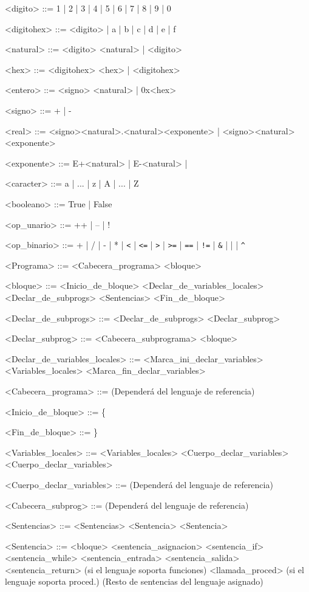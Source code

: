 \documentclass{scrartcl}
\begin{document}
\setlength{\grammarparsep}{4pt plus 1pt minus 1pt}
\begin{grammar}

<digito> ::= 1 | 2 | 3 | 4 | 5 | 6 | 7 | 8 | 9 | 0

<digitohex> ::= <digito> | a | b | c | d | e | f

<natural> ::= <digito> <natural> | <digito>

<hex> ::= <digitohex> <hex> | <digitohex>

<entero> ::= <signo> <natural> | 0x<hex>

<signo> ::= + | -

<real> ::= <signo><natural>.<natural><exponente> | <signo><natural><exponente>

<exponente> ::= E+<natural> | E-<natural> |

<caracter> ::= a | ... | z | A | ... | Z

<booleano> ::= True | False

<op_unario> ::= ++ | -- | !

<op_binario> ::= + | / | - | * | \verb|<| | \verb|<=| | \verb|>| | \verb|>=| | \verb|==| | \verb|!=| | \verb|&| | \verb||| | \verb|^|

<Programa> ::= <Cabecera_programa> <bloque>

<bloque> ::= <Inicio_de_bloque>
 <Declar_de_variables_locales>
 <Declar_de_subprogs>
 <Sentencias>
 <Fin_de_bloque>

<Declar_de_subprogs> ::= <Declar_de_subprogs> <Declar_subprog>

<Declar_subprog> ::= <Cabecera_subprograma> <bloque>

<Declar_de_variables_locales> ::= <Marca_ini_declar_variables>
<Variables_locales>
<Marca_fin_declar_variables>

<Cabecera_programa> ::= (Dependerá del lenguaje de referencia)

<Inicio_de_bloque> ::= \{

<Fin_de_bloque> ::= \}

<Variables_locales> ::= <Variables_locales> <Cuerpo_declar_variables>
\alt <Cuerpo_declar_variables>

<Cuerpo_declar_variables> ::= (Dependerá del lenguaje de referencia)

<Cabecera_subprog> ::= (Dependerá del lenguaje de referencia)

<Sentencias> ::= <Sentencias> <Sentencia>
\alt <Sentencia>

<Sentencia> ::= <bloque>
\alt <sentencia_asignacion>
\alt <sentencia_if>
\alt <sentencia_while>
\alt <sentencia_entrada>
\alt <sentencia_salida>
\alt <sentencia_return> (si el lenguaje soporta funciones)
\alt <llamada_proced> (si el lenguaje soporta proced.)
\alt (Resto de sentencias del lenguaje asignado)


\end{grammar}
\end{document}
